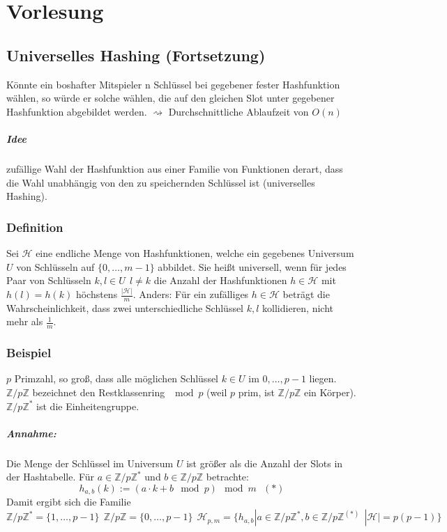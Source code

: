 \chapter{Vorlesung}
\section*{Universelles Hashing (Fortsetzung)}
Könnte ein boshafter Mitspieler n Schlüssel bei gegebener fester Hashfunktion wählen, so würde er solche wählen, die auf den gleichen Slot unter gegebener Hashfunktion abgebildet werden. $\rightsquigarrow$ Durchschnittliche Ablaufzeit von $O(n)$
\paragraph{Idee} zufällige Wahl der Hashfunktion aus einer Familie von Funktionen derart, dass die Wahl unabhängig von den zu speichernden Schlüssel ist (universelles Hashing).
\subsection{Definition}
Sei $\mathcal{H}$ eine endliche Menge von Hashfunktionen, welche ein gegebenes Universum $U$ von Schlüsseln auf $\{ 0,\ldots,m-1 \}$ abbildet. Sie heißt universell, wenn für jedes Paar von Schlüsseln $k,l\in U~~l\neq k$ die Anzahl der Hashfunktionen $h\in \mathcal{H}$ mit $h(l)=h(k)$ höchstens $\frac{|\mathcal{H}|}{m}$. Anders: Für ein zufälliges $h\in\mathcal{H}$ beträgt die Wahrscheinlichkeit, dass zwei unterschiedliche Schlüssel $k,l$ kollidieren, nicht mehr als $\frac{1}{m}$.
\subsection{Beispiel}
$p$ Primzahl, so groß, dass alle möglichen Schlüssel $k\in U$ im $0,\ldots,p-1$ liegen. $\mathbb{Z}/p\mathbb{Z}$ bezeichnet den Restklassenring $\mod{p}$ (weil $p$ prim, ist $\mathbb{Z}/p\mathbb{Z}$ ein Körper).
$\mathbb{Z}/p\mathbb{Z}^*$ ist die Einheitengruppe.
\paragraph{Annahme:} Die Menge der Schlüssel im Universum $U$ ist größer als die Anzahl der Slots in der Hashtabelle. Für $a\in \mathbb{Z}/p\mathbb{Z}^*$ und $b\in \mathbb{Z}/p\mathbb{Z}$ betrachte:
\[ h_{a,b}(k) := (a\cdot k + b \mod{p})\mod{m} ~~~(*)\]
Damit ergibt sich die Familie
\[ \mathbb{Z}/p\mathbb{Z}^*=\{ 1,\ldots,p-1 \}~~\mathbb{Z}/p\mathbb{Z}=\{ 0,\ldots,p-1 \}~~ \mathcal{H}_{p,m}=\{h_{a,b}|a\in \mathbb{Z}/p\mathbb{Z}^*, b \in\mathbb{Z}/p\mathbb{Z}^{(*)}~~|\mathcal{H}|=p(p-1)  \} \]
